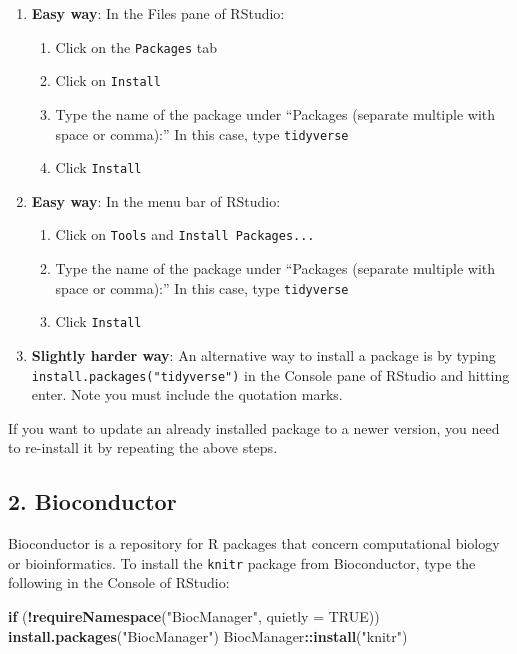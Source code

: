 \documentclass[
]{book}
\newenvironment{Shaded}{\begin{snugshade}}{\end{snugshade}}
\newcommand{\AttributeTok}[1]{\textcolor[rgb]{0.13,0.29,0.53}{#1}}
\newcommand{\ConstantTok}[1]{\textcolor[rgb]{0.56,0.35,0.01}{#1}}
\newcommand{\ControlFlowTok}[1]{\textcolor[rgb]{0.13,0.29,0.53}{\textbf{#1}}}
\newcommand{\FunctionTok}[1]{\textcolor[rgb]{0.13,0.29,0.53}{\textbf{#1}}}
\newcommand{\NormalTok}[1]{#1}
\newcommand{\SpecialCharTok}[1]{\textcolor[rgb]{0.81,0.36,0.00}{\textbf{#1}}}
\newcommand{\StringTok}[1]{\textcolor[rgb]{0.31,0.60,0.02}{#1}}
\providecommand{\tightlist}{%
  \setlength{\itemsep}{0pt}\setlength{\parskip}{0pt}}
\begin{document}
\begin{enumerate}
\def\labelenumi{\arabic{enumi}.}
\tightlist
\item
  \textbf{Easy way}: In the Files pane of RStudio:

  \begin{enumerate}
  \def\labelenumii{\alph{enumii}.}
  \tightlist
  \item
    Click on the \texttt{Packages} tab
  \item
    Click on \texttt{Install}
  \item
    Type the name of the package under ``Packages (separate multiple with space or comma):'' In this case, type \texttt{tidyverse}
  \item
    Click \texttt{Install}
  \end{enumerate}
\item
  \textbf{Easy way}: In the menu bar of RStudio:

  \begin{enumerate}
  \def\labelenumii{\alph{enumii}.}
  \tightlist
  \item
    Click on \texttt{Tools} and \texttt{Install\ Packages...}
  \item
    Type the name of the package under ``Packages (separate multiple with space or comma):'' In this case, type \texttt{tidyverse}
  \item
    Click \texttt{Install}
  \end{enumerate}
\item
  \textbf{Slightly harder way}: An alternative way to install a package is by typing \texttt{install.packages("tidyverse")} in the Console pane of RStudio and hitting enter. Note you must include the quotation marks.
\end{enumerate}

If you want to update an already installed package to a newer version, you need to re-install it by repeating the above steps.

\subsection*{2. Bioconductor}\label{bioconductor}

Bioconductor is a repository for R packages that concern computational biology or bioinformatics. To install the \texttt{knitr} package from Bioconductor, type the following in the Console of RStudio:

\begin{Shaded}
\begin{Highlighting}[]
\ControlFlowTok{if}\NormalTok{ (}\SpecialCharTok{!}\FunctionTok{requireNamespace}\NormalTok{(}\StringTok{"BiocManager"}\NormalTok{, }\AttributeTok{quietly =} \ConstantTok{TRUE}\NormalTok{))}
    \FunctionTok{install.packages}\NormalTok{(}\StringTok{"BiocManager"}\NormalTok{)}
\NormalTok{BiocManager}\SpecialCharTok{::}\FunctionTok{install}\NormalTok{(}\StringTok{"knitr"}\NormalTok{)}
\end{Highlighting}
\end{Shaded}
\end{document}
